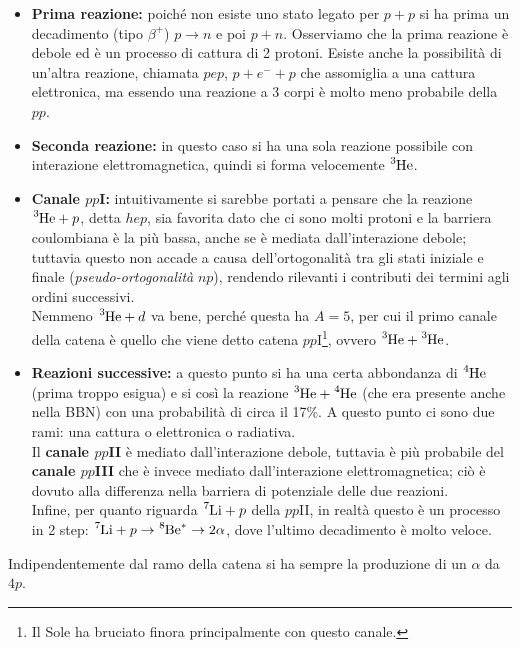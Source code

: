 \begin{itemize}
    \item \textbf{Prima reazione:} poiché non esiste uno stato legato per $p+p$ si ha prima un decadimento (tipo $\beta^+$) $p\to n$ e poi $p+n$. Osserviamo che la prima reazione è debole ed è un processo di cattura di 2 protoni. Esiste anche la possibilità di un'altra reazione, chiamata $pep$, $p+e^-+p$ che assomiglia a una cattura elettronica, ma essendo una reazione a 3 corpi è molto meno probabile della $pp$.
    \item \textbf{Seconda reazione:} in questo caso si ha una sola reazione possibile con interazione elettromagnetica, quindi si forma velocemente $\ce{^3He}$.
    \item \textbf{Canale $pp$I:} intuitivamente si sarebbe portati a pensare che la reazione $\ce{^3He} + p$, detta $hep$, sia favorita dato che ci sono molti protoni e la barriera coulombiana è la più bassa, anche se è mediata dall'interazione debole; tuttavia questo non accade a causa dell'ortogonalità tra gli stati iniziale e finale (\textit{pseudo-ortogonalità} $np$), rendendo rilevanti i contributi dei termini agli ordini successivi.\\
    Nemmeno $\ce{^3He}+d$ va bene, perché questa ha $A=5$, per cui il primo canale della catena è quello che viene detto catena $pp$I\footnote{Il Sole ha bruciato finora principalmente con questo canale.}, ovvero $\ce{^3He}+\ce{^3He}$.
    \item \textbf{Reazioni successive:} a questo punto si ha una certa abbondanza di $\ce{^4He}$ (prima troppo esigua) e si  così la reazione $\ce{^3He}+\ce{^4He}$ (che era presente anche nella BBN) con una probabilità di circa il 17\%. A questo punto ci sono due rami: una cattura o elettronica o radiativa.\\ 
    Il \textbf{canale $pp$II} è mediato dall'interazione debole, tuttavia è più probabile del \textbf{canale $pp$III} che è invece mediato dall'interazione elettromagnetica; ciò è dovuto alla differenza nella barriera di potenziale delle due reazioni.\\
    Infine, per quanto riguarda $\ce{^7Li}+p$ della $pp$II, in realtà questo è un processo in 2 step: $\ce{^7Li}+p\to\ce{^8Be}^*\to2\alpha$, dove l'ultimo decadimento è molto veloce.
\end{itemize} 
Indipendentemente dal ramo della catena si ha sempre la produzione di un $\alpha$ da $4p$.

